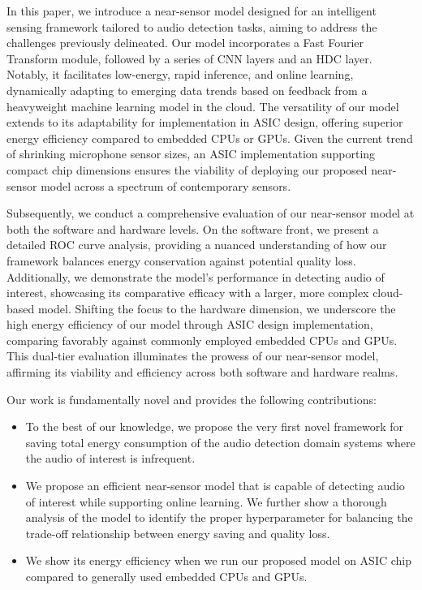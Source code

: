 In this paper, we introduce a near-sensor model designed for an intelligent sensing framework tailored to audio detection tasks, aiming to address the challenges previously delineated. Our model incorporates a Fast Fourier Transform module, followed by a series of CNN layers and an HDC layer. Notably, it facilitates low-energy, rapid inference, and online learning, dynamically adapting to emerging data trends based on feedback from a heavyweight machine learning model in the cloud. The versatility of our model extends to its adaptability for implementation in ASIC design, offering superior energy efficiency compared to embedded CPUs or GPUs. Given the current trend of shrinking microphone sensor sizes, an ASIC implementation supporting compact chip dimensions ensures the viability of deploying our proposed near-sensor model across a spectrum of contemporary sensors.

Subsequently, we conduct a comprehensive evaluation of our near-sensor model at both the software and hardware levels. On the software front, we present a detailed ROC curve analysis, providing a nuanced understanding of how our framework balances energy conservation against potential quality loss. Additionally, we demonstrate the model's performance in detecting audio of interest, showcasing its comparative efficacy with a larger, more complex cloud-based model. Shifting the focus to the hardware dimension, we underscore the high energy efficiency of our model through ASIC design implementation, comparing favorably against commonly employed embedded CPUs and GPUs. This dual-tier evaluation illuminates the prowess of our near-sensor model, affirming its viability and efficiency across both software and hardware realms.

Our work is fundamentally novel and provides the following contributions:
\begin{itemize}
    \item To the best of our knowledge, we propose the very first novel framework for saving total energy consumption of the audio detection domain systems where the audio of interest is infrequent.
    \item We propose an efficient near-sensor model that is capable of detecting audio of interest while supporting online learning. We further show a thorough analysis of the model to identify the proper hyperparameter for balancing the trade-off relationship between energy saving and quality loss.
    \item We show its energy efficiency when we run our proposed model on ASIC chip compared to generally used embedded CPUs and GPUs.
\end{itemize}
